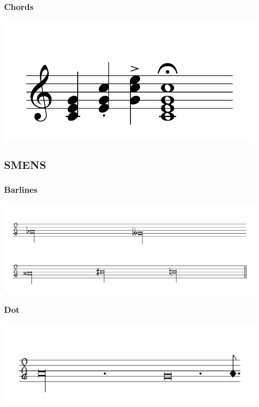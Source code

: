 \documentclass{article}
\begin{document}
\subsubsection{Chords}
\includegraphics[scale=0.5]{figures_tests/pdf/skern/chords.pdf}





\subsection{SMENS}
    \subsubsection{Barlines}
        \includegraphics[scale=0.4]{figures_tests/pdf/smens/barlines1.pdf}

    \subsubsection{Dot}
        \includegraphics[scale=0.5]{figures_tests/pdf/smens/dot1.pdf}
\end{document}
